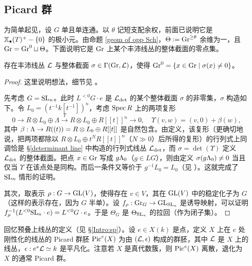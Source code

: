 
\subsection{Picard 群}\label{The Picard group}

为简单起见，设 $G$ 单且单连通。以 $\theta$ 记短支配余权，前面已说明它是 $\mathbb{X}_\bullet(T)^+-\{0\}$ 的极小元。由命题 \ref{geom of opp Sch}，$\Theta:={\operatorname{Gr}}^{\geq \theta}$ 余维为一，且 ${\operatorname{Gr}}={\operatorname{Gr}}^0\sqcup \Theta$。下面说明它是 ${\operatorname{Gr}}$ 上某个丰沛线丛的整体截面的零点集。

\begin{prop}\label{big cell 2}
存在丰沛线丛 ${\mathcal L}$ 与整体截面 $\sigma\in{\Gamma}({\operatorname{Gr}},{\mathcal L})$，使得 ${\operatorname{Gr}}^0=\{x\in{\operatorname{Gr}} \mid \sigma(x)\neq 0\}$。
\end{prop}

\begin{proof}
这里说明想法，细节见 \cite[Lemma 2, Corollary 3]{Fa}。

先考虑 $G={\operatorname{SL}}_n$。此时 $L^{<0}G\cdot e$ 是 ${\mathcal L}_{\det}$ 的某个整体截面 $\sigma$ 的非零集，$\sigma$ 构造如下。令 $L_0=(t^{-1}k[t^{-1}])^n$，考虑 $\operatorname{Spec} R$ 上的两项复形
\[0\to R\otimes L_0\oplus\Lambda\stackrel{\Upsilon}{\to} R\otimes L_0\oplus R[[t]]^n\to 0,\quad \Upsilon(v,w)=(v,0)+\beta(w),\]
其中 $\beta: {\Lambda}\to R((t))=R\otimes L_0\oplus R[[t]]$ 是自然包含。由定义，该复形（更确切地说，把两项都除以 $ R\otimes L_0\oplus t^NR[[t]]^n$（$N\gg 0$）后所得的复形）的行列式上同调恰是 \S\ref{determinant line} 中构造的行列式线丛 ${\mathcal L}_{\det}$，而 $\sigma=\det(\Upsilon)$ 定义 ${\mathcal L}_{\det}$ 的整体截面。把点 $x\in {\operatorname{Gr}}$ 写成 $g{\Lambda}_0$（$g\in LG$），则由定义 $\sigma(g{\Lambda}_0)\neq 0$ 当且仅当 $\Upsilon$ 在该点处是同构。而后一条件又等价于 $g^{-1} L_0=L_0$（见 \cite[Lemma 2]{Fa}）。这就完成了 ${\operatorname{SL}}_n$ 情形的证明。

其次，取表示 $\rho:G\to {\operatorname{GL}}(V)$，使得存在 $v\in V$，其在 ${\operatorname{GL}}(V)$ 中的稳定化子为 $G$（这样的表示存在，因为 $G$ 半单）。设 $f_\rho: {\operatorname{Gr}}_G\to {\operatorname{GL}}_{{\operatorname{SL}}_n}$ 是诱导映射，可以证明 $f_\rho^{-1}(L^{<0}{\operatorname{SL}}_n\cdot e)=L^{<0}G\cdot e$。于是 $\Theta_G$ 是 $\Theta_{{\operatorname{SL}}_n}$ 的拉回（作为闭子集）。
\end{proof}

回忆预叠上线丛的定义（见 \S\ref{Intro:sp}）。设 $e\in X(k)$ 是点，定义 $X$ 上在 $e$ 处刚性化的线丛的 Picard 群胚 ${\operatorname{Pic}}^e(X)$ 为由 $({\mathcal L},\epsilon)$ 构成的群胚，其中 ${\mathcal L}$ 是 $X$ 上的线丛，$\epsilon: e^*{\mathcal L}\simeq k$ 是平凡化。注意若 $X$ 是真代数簇，则 ${\operatorname{Pic}}^e(X)$ 离散，退化为 $X$ 的通常 Picard 群。

